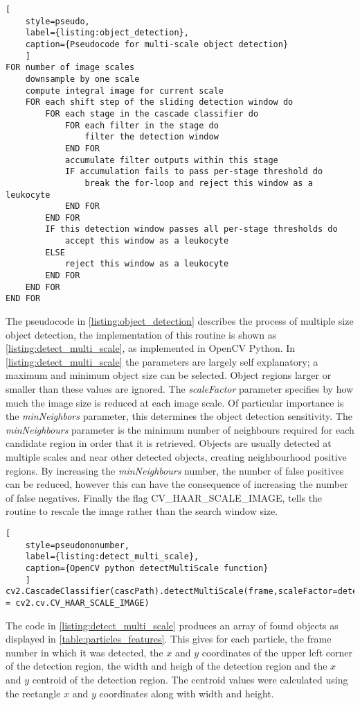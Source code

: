 \begin{lstlisting}[
	style=pseudo,
	label={listing:object_detection},
	caption={Pseudocode for multi-scale object detection}
	]
FOR number of image scales
	downsample by one scale
	compute integral image for current scale
	FOR each shift step of the sliding detection window do
		FOR each stage in the cascade classifier do
			FOR each filter in the stage do
				filter the detection window
			END FOR
			accumulate filter outputs within this stage
			IF accumulation fails to pass per-stage threshold do
				break the for-loop and reject this window as a leukocyte
			END FOR
		END FOR
		IF this detection window passes all per-stage thresholds do
			accept this window as a leukocyte
		ELSE
			reject this window as a leukocyte
		END FOR
	END FOR
END FOR
\end{lstlisting}
The pseudocode in \autoref{listing:object_detection} describes the process of multiple size object detection, the implementation of this routine is shown as \autoref{listing:detect_multi_scale}, as implemented in OpenCV Python. In \autoref{listing:detect_multi_scale} the parameters are largely self explanatory; a maximum and minimum object size can be selected. Object regions larger or smaller than these values are ignored. The \emph{scaleFactor} parameter specifies by how much the image size is reduced at each image scale. Of particular importance is the \emph{minNeighbors} parameter, this determines the object detection sensitivity. The \emph{minNeighbours} parameter is the minimum number of neighbours required for each candidate region in order that it is retrieved. Objects are usually detected at multiple scales and near other detected objects, creating neighbourhood positive regions. By increasing the \emph{minNeighbours} number, the number of false positives can be reduced, however this can have the consequence of increasing the number of false negatives. Finally the flag CV\_HAAR\_SCALE\_IMAGE, tells the routine to rescale the image rather than the search window size.

\begin{lstlisting}[
	style=pseudononumber,
	label={listing:detect_multi_scale},
	caption={OpenCV python detectMultiScale function}
	]
cv2.CascadeClassifier(cascPath).detectMultiScale(frame,scaleFactor=detectParticlesScaleFactor,minNeighbors=detectParticlesMinNeighbors,minSize=detectParticlesMinSize,maxSize=detectParticlesMaxSize,flags = cv2.cv.CV_HAAR_SCALE_IMAGE)
\end{lstlisting}

The code in \autoref{listing:detect_multi_scale} produces an array of found objects as displayed in \autoref{table:particles_features}. This gives for each particle, the frame number in which it was detected, the $x$ and $y$ coordinates of the upper left corner of the detection region, the width and heigh of the detection region and the $x$ and $y$ centroid of the detection region. The centroid values were calculated using the rectangle $x$ and $y$ coordinates along with width and height.

